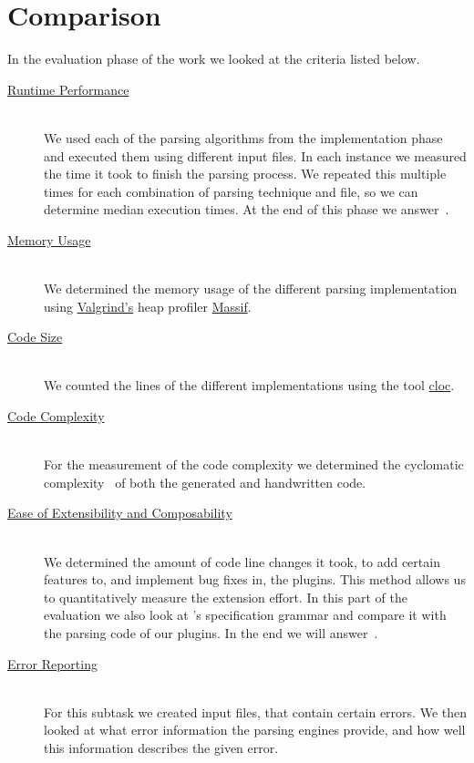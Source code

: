 \chapter{Comparison}
\label{sec:comparison}

In the evaluation phase of the work we looked at the criteria listed below.

\begin{description}

  \item[{\hyperref[sec:run_time_performance]{Runtime Performance}}]~\\[0.1cm]
  We used each of the parsing algorithms from the implementation phase and executed them using different input files. In each instance we measured the time it took to finish the parsing process. We repeated this multiple times for each combination of parsing technique and file, so we can determine median execution times. At the end of this phase we answer~.

  \speed*

  \item[{\hyperref[sec:memory_usage]{Memory Usage}}]~\\[0.1cm]
  We determined the memory usage of the different parsing implementation using \href{http://valgrind.org}{Valgrind's} heap profiler \href{http://valgrind.org/docs/manual/ms-manual.html}{Massif}.

  \item[{\hyperref[sec:code_size]{Code Size}}]~\\[0.1cm]
  We counted the lines of the different implementations using the tool \href{https://github.com/AlDanial/cloc}{cloc}.

  \item[{\hyperref[sec:code_complexity]{Code Complexity}}]~\\[0.1cm]
  For the measurement of the code complexity we determined the cyclomatic complexity~\cite{mccabe1976complexity} of both the generated and handwritten code.

  \item[{\hyperref[sec:extensibility]{Ease of Extensibility and Composability}}]~\\[0.1cm]
  We determined the amount of code line changes it took, to add certain features to, and implement bug fixes in, the  plugins. This method allows us to quantitatively measure the extension effort. In this part of the evaluation we also look at ’s specification grammar and compare it with the parsing code of our plugins. In the end we will answer~.

  \closeness*

  \item[{\hyperref[sec:error_reporting]{Error Reporting}}]~\\[0.1cm]
  For this subtask we created  input files, that contain certain errors. We then looked at what error information the parsing engines provide, and how well this information describes the given error.

\end{description}

